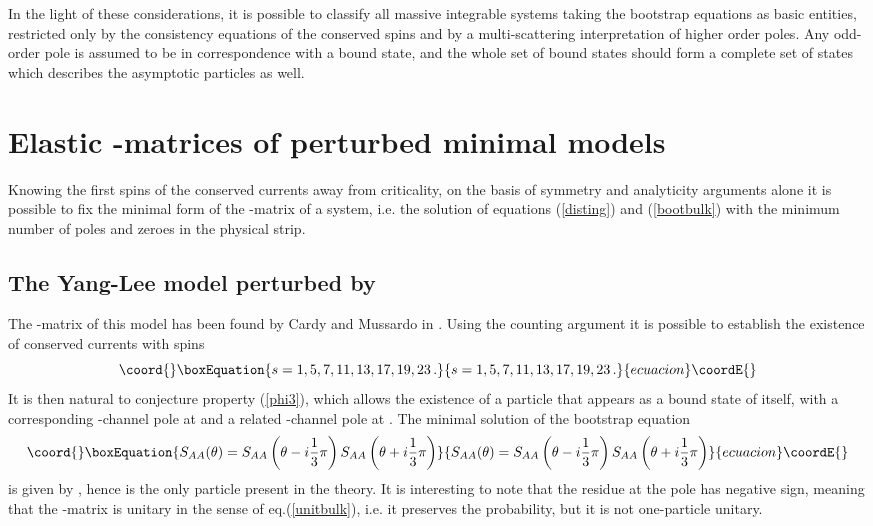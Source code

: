 \documentclass[a4paper,12pt]{report}
\begin{document}
In the light of these considerations, it is possible to classify all massive integrable systems taking the
bootstrap equations as basic entities, restricted only by the consistency equations of the conserved spins and by
a multi-scattering interpretation of higher order poles. Any odd-order pole is assumed to be in correspondence
with a bound state, and the whole set of bound states should form a complete set of states which describes the
asymptotic particles as well.

\vspace{1cm}

\section{Elastic \coordHE{}-matrices of perturbed minimal models}

Knowing the first spins of the conserved currents away from criticality, on the basis of symmetry and analyticity
arguments alone it is possible to fix the minimal form of the \coordHE{}-matrix of a system, i.e. the solution of
equations (\ref{disting}) and (\ref{bootbulk}) with the minimum number of poles and zeroes in the physical strip.

\subsection{The Yang-Lee model perturbed by \coordHE{}}

The \coordHE{}-matrix of this model has been found by Cardy and Mussardo in \cite{SYL}. Using the counting argument it is
possible to establish the existence of conserved currents with spins
\begin{equation}\coord{}\boxEquation{
s=1,5,7,11,13,17,19,23\,.
}{
s=1,5,7,11,13,17,19,23\,.
}{ecuacion}\coordE{}\end{equation}
It is then natural to conjecture property (\ref{phi3}), which allows the existence of a particle \coordHE{} that appears
as a bound state of itself, with a corresponding \coordHE{}-channel pole at \coordHE{} and a related
\coordHE{}-channel pole at \coordHE{}. The minimal solution of the bootstrap equation
\begin{equation}\coord{}\boxEquation{
S_{AA}(\theta)=S_{AA}\left(\theta-i\frac{1}{3}\pi\right)S_{AA}\left(\theta+i\frac{1}{3}\pi\right)
}{
S_{AA}(\theta)=S_{AA}\left(\theta-i\frac{1}{3}\pi\right)S_{AA}\left(\theta+i\frac{1}{3}\pi\right)
}{ecuacion}\coordE{}\end{equation}
is given by \coordHE{}, hence \coordHE{} is the only particle present in the theory. It is
interesting to note that the residue at the pole \coordHE{} has negative sign, meaning that the
\coordHE{}-matrix is unitary in the sense of eq.(\ref{unitbulk}), i.e. it preserves the probability, but it is not
one-particle unitary.
\end{document}

